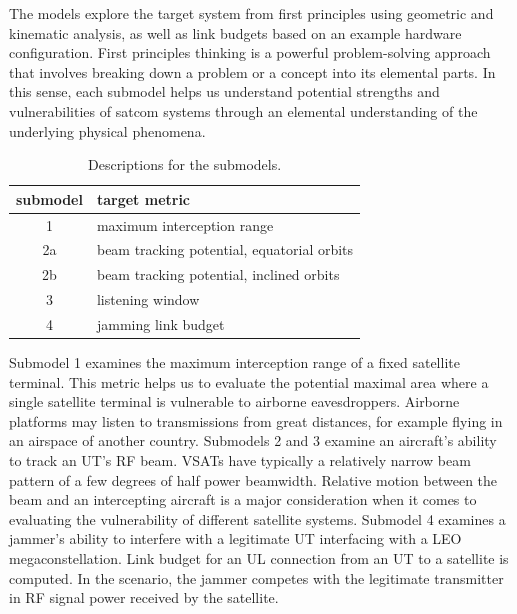 \documentclass[english, 12pt, a4paper, elec, utf8, a-1b, online]{aaltothesis}
\begin{document}
The models explore the target system from first principles using geometric and kinematic analysis, as well as link budgets based on an example hardware configuration.
First principles thinking is a powerful problem-solving approach that involves breaking down a problem or a concept into its elemental parts.
In this sense, each submodel helps us understand potential strengths and vulnerabilities of satcom systems through an elemental understanding of the underlying physical phenomena.

\begin{table}[h]
  \centering
  \caption{Descriptions for the submodels.}
  \begin{tabular}{@{}cl@{}}
  \toprule
  \multicolumn{1}{l}{submodel}  & target metric                              \\ \midrule
  1                             & maximum interception range                 \\
  2a                            & beam tracking potential, equatorial orbits \\
  2b                            & beam tracking potential, inclined orbits   \\
  3                             & listening window                           \\
  4                             & jamming link budget                        \\ \bottomrule
  \end{tabular}
  \label{table-submodel-descriptions}
\end{table}

Submodel 1 examines the maximum interception range of a fixed satellite terminal.
This metric helps us to evaluate the potential maximal area where a single satellite terminal is vulnerable to airborne eavesdroppers.
Airborne platforms may listen to transmissions from great distances, for example flying in an airspace of another country.
Submodels 2 and 3 examine an aircraft's ability to track an UT's RF beam.
VSATs have typically a relatively narrow beam pattern of a few degrees of half power beamwidth.
Relative motion between the beam and an intercepting aircraft is a major consideration when it comes to evaluating the vulnerability of different satellite systems.
Submodel 4 examines a jammer's ability to interfere with a legitimate UT interfacing with a LEO megaconstellation.
Link budget for an UL connection from an UT to a satellite is computed.
In the scenario, the jammer competes with the legitimate transmitter in RF signal power received by the satellite.
\end{document}
